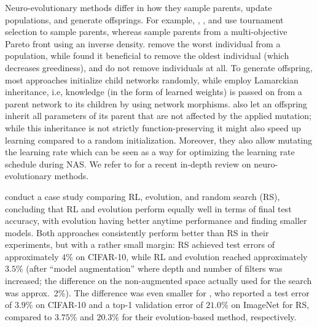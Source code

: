 \documentclass[twoside,11pt]{article}
\begin{document}
Neuro-evolutionary methods differ in how they sample parents, update populations, and generate offsprings. For example, \citet{DBLP:journals/corr/RealMSSSLK17}, \citet{real_regularized_2018}, and \citet{liu_hierarchical_2017} use tournament selection \citep{Goldberg91acomparative} to sample parents, whereas \citet{elsken_multi_2018} sample parents from a multi-objective Pareto front using an inverse density. \citet{DBLP:journals/corr/RealMSSSLK17} remove the worst individual from a population, while \citet{real_regularized_2018} found it beneficial to remove the oldest individual (which decreases greediness), and \citet{liu_hierarchical_2017} do not remove individuals at all.
To generate offspring, most approaches initialize child networks randomly, while \citet{elsken_multi_2018} employ Lamarckian inheritance, i.e, knowledge (in the form of learned weights) is passed on from a parent network to its children by using network morphisms. \citet{DBLP:journals/corr/RealMSSSLK17} also let an offspring inherit all parameters of its parent that are not affected by the applied mutation; while this inheritance is not strictly function-preserving it might also speed up learning compared to a random initialization. Moreover, they also allow mutating the learning rate which can be seen as a way for optimizing the learning rate schedule during NAS.  We refer to \citet{stanley2019} for a recent in-depth review on neuro-evolutionary methods.


\citet{real_regularized_2018} conduct a case study comparing RL, evolution, and random search (RS), concluding that RL and evolution perform equally well in terms of final test accuracy, with evolution having better anytime performance and finding smaller models. Both approaches consistently perform better than RS in their experiments, but with a rather small margin: RS achieved test errors of approximately $4\%$ on CIFAR-10, while RL and evolution reached approximately $3.5\%$ (after ``model augmentation'' where depth and number of filters was increased; the difference on the non-augmented space actually used for the search was approx.\ 2\%). The difference was even smaller for \citet{liu_hierarchical_2017}, who reported a test error of $3.9\%$ on CIFAR-10 and a top-1 validation error of $21.0\%$ on ImageNet for RS, compared to $3.75\%$ and $20.3\%$ for their evolution-based method, respectively.
\end{document}
